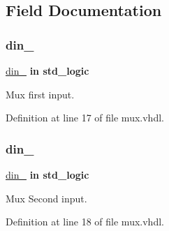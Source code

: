\subsection{Field Documentation}
\mbox{\label{classmux__using__with_a8d04e56f35c90f337612a9331e852370}} 
\subsubsection{\texorpdfstring{din\+\_}{din\_0}}
{\footnotesize\ttfamily \hyperlink{classmux__using__with_a8d04e56f35c90f337612a9331e852370}{din\+\_} {\bfseries \textcolor{keywordflow}{in}\textcolor{vhdlchar}{ }} {\bfseries \textcolor{comment}{std\+\_\+logic}\textcolor{vhdlchar}{ }} \hspace{0.3cm}{\ttfamily [Port]}}



Mux first input. 



Definition at line 17 of file mux.\+vhdl.

\mbox{\label{classmux__using__with_a285845c20ff8bcccff59708069857ad1}} 
\subsubsection{\texorpdfstring{din\+\_}{din\_1}}
{\footnotesize\ttfamily \hyperlink{classmux__using__with_a285845c20ff8bcccff59708069857ad1}{din\+\_} {\bfseries \textcolor{keywordflow}{in}\textcolor{vhdlchar}{ }} {\bfseries \textcolor{comment}{std\+\_\+logic}\textcolor{vhdlchar}{ }} \hspace{0.3cm}{\ttfamily [Port]}}



Mux Second input. 



Definition at line 18 of file mux.\+vhdl.

\mbox{\label{classmux__using__with_a0a6af6eef40212dbaf130d57ce711256}} 

